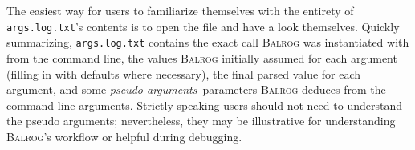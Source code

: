 \documentclass[11pt]{book}
\newcommand{\codett}[1]{\texttt{#1}}
\newcommand{\galsim}{\textsc{GalSim}}
\newcommand{\balrog}{\textsc{Balrog}}
\newcommand{\sersic}{S\'{e}rsic}
\begin{document}
The easiest way for users to familiarize themselves with the entirety of \codett{args.log.txt}'s contents is to
open the file and have a look themselves.
Quickly summarizing, \codett{args.log.txt} contains the exact call \balrog{} was
instantiated with from the command line, the values \balrog{} initially assumed
for each argument (filling in with defaults where necessary), the final parsed value
for each argument, and some \emph{pseudo arguments}--parameters \balrog{} deduces from
the command line arguments. Strictly speaking users should not need to understand the 
pseudo arguments; nevertheless, they may be illustrative
for understanding \balrog{}'s workflow or helpful during debugging.


\outtab{}



%
%
\end{document}
